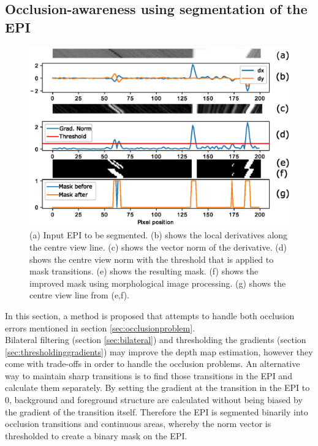 \documentclass  [
  paper    = a4,
  BCOR     = 10mm,
  twoside,
  fontsize = 12pt,
  fleqn,
  toc      = bibnumbered,
  toc      = listofnumbered,
  numbers  = noendperiod,
  headings = normal,
  listof   = leveldown,
  version  = 3.03
]                                       {scrreprt}
\begin{document}
 \subsection{Occlusion-awareness using segmentation of the EPI}
 \label{sec:occlusionsegmentation}
 \begin{figure}[h!]
 	\centering
 	\includegraphics[width=1\linewidth]{images/derivatives_full}
 	\caption[Segmenting an EPI]{(a) Input EPI to be segmented. (b) shows the local derivatives along the centre view line. (c) shows the vector norm of the derivative. (d) shows the centre view norm with the threshold that is applied to mask transitions. (e) shows the resulting mask. (f) shows the improved mask using morphological image processing. (g) shows the centre view line from (e,f). }
 	\label{fig:derivativesfull}
 \end{figure}
 In this section, a method is proposed that attempts to handle both occlusion errors mentioned in section \ref{sec:occlusionproblem}.\\
 Bilateral filtering (section \ref{sec:bilateral}) and thresholding the gradients (section \ref{sec:thresholdinggradients}) may improve the depth map estimation, however they come with trade-offs in order to handle the occlusion problems. An alternative way to maintain sharp transitions is to find those transitions in the EPI and calculate them separately. By setting the gradient at the transition in the EPI to 0, background and foreground structure are calculated without being biased by the gradient of the transition itself. Therefore the EPI is segmented binarily into occlusion transitions and continuous areas, whereby the norm vector is thresholded to create a binary mask on the EPI. \\
\end{document}

